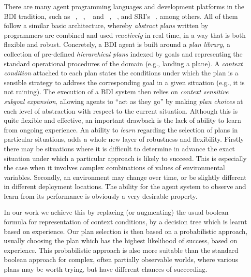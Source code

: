 There are many agent programming languages and development platforms
in the BDI tradition, such as \PRS\ \cite{Georgeff89-PRS},
\JACK~\cite{BusettaRHL:AL99-JACK}, \TAPL~\cite{Hindriks99:Agent} and
\DAPL~\cite{Dastani:JAAMAS08-2APL}, \JASON~\cite{jasonbook}, and SRI's
\SPARK~\cite{MorelyM:AAMAS04-SPARK}, among others. 
All of them
follow a similar basic architecture, whereby \emph{abstract plans}
written by programmers are combined and used \emph{reactively} in
real-time, in a way that is both flexible and robust. Concretely, a
BDI agent is built around a \textit{plan library}, a collection of
pre-defined \textit{hierarchical plans} indexed by goals and
representing the standard operational procedures of the domain (e.g.,
landing a plane).
%
A \emph{context condition} attached to each plan states the
conditions under which the plan is a sensible strategy to address the
corresponding goal in a given situation (e.g., it is not raining). The execution
of a BDI system then relies on \textit{context sensitive subgoal
expansion}, allowing agents to ``act as they go'' by making \emph{plan choices}
at each level of abstraction with respect to the current situation.
%
Although this is quite flexible and effective, an important drawback
is the lack of ability to learn from ongoing experience. An ability to
{\it learn} regarding the selection of plans in particular situations,
adds a whole new layer of robustness and flexibility. Firstly there
may be situations where it is difficult to determine in advance the
exact situation under which a particular approach is likely to
succeed. This is especially the case when it involves complex combinations of
values of environmental variables. Secondly, an environment may change
over time, or be slightly different in different deployment
locations. The ability for the agent system to observe and learn
from its performance is obviously a very desirable property.

In our work we achieve this by replacing (or augmenting) the usual
boolean formula for representation of context conditions, by a
decision tree \cite{Mitchell97:ML} which is learnt based on
experience. Our plan selection is then based on a probabilistic
approach, usually choosing the plan which has the highest likelihood
of success, based on experience. This probabilistic approach is also
more suitable than the standard boolean approach for complex, often
partially observable worlds, where various plans may be worth trying,
but have different chances of succeeding.

